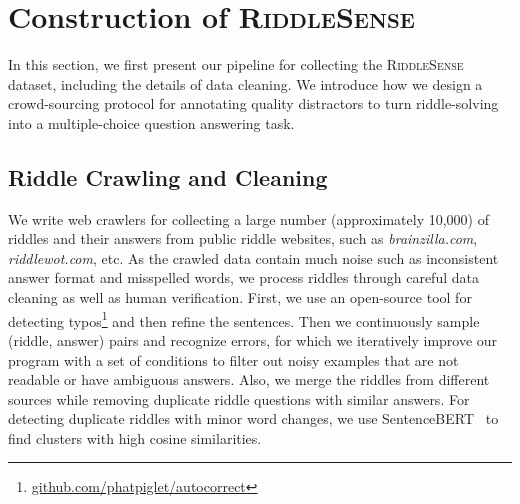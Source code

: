 \section{Construction of \textsc{RiddleSense}}
\label{sec:datagen}
In this section,
we first present our pipeline for collecting the \textsc{RiddleSense} dataset, including the details of data cleaning.
We introduce how we design a crowd-sourcing protocol for annotating quality distractors to turn riddle-solving into a multiple-choice question answering task.



\subsection{Riddle Crawling and Cleaning}

We write web crawlers for collecting a large number (approximately 10,000) of riddles and their answers from public riddle websites, such as \textit{brainzilla.com}, \textit{riddlewot.com}, etc.
As the crawled data contain much noise such as inconsistent answer format and misspelled words, we process riddles through careful data cleaning as well as human verification.
First, we use an open-source tool for detecting typos\footnote{\url{github.com/phatpiglet/autocorrect}} and then refine the sentences.
Then we continuously sample (riddle, answer) pairs and recognize errors, for which we iteratively improve our program with a set of conditions to filter out noisy examples that are not readable or have ambiguous answers.
Also, we merge the riddles from different sources while removing duplicate riddle questions with similar answers.
For detecting duplicate riddles with minor word changes, we use SentenceBERT~\cite{reimers2019sentence} to find clusters with high cosine similarities.


